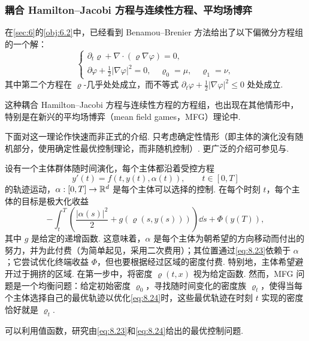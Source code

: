 \subsubsection*{耦合 Hamilton--Jacobi 方程与连续性方程、平均场博弈}
在\autoref{sec:6}的\autoref{obj:6.2}中，已经看到 Benamou--Brenier 方法给出了以下偏微分方程组的一个解：
\[
\begin{cases}
\partial_t\varrho+\nabla\cdot(\varrho\nabla\varphi)=0,\\
\partial\varphi+\frac12|\nabla\varphi|^2=0,\quad\varrho_0=\mu,\quad\varrho_1=\nu,
\end{cases}
\]
其中第二个方程在 $\varrho$-几乎处处成立，而不等式 $\partial_t\varphi+\frac12|\nabla\varphi|^2\leq0$ 处处成立.

\label{idx:i27-p316}
这种耦合 Hamilton--Jacobi 方程与连续性方程的方程组，也出现在其他情形中，特别是在新兴的平均场博弈（mean field games，MFG）理论中.

\label{idx:i97-p316}
下面对这一理论作快速而非正式的介绍. 只考虑确定性情形（即主体的演化没有随机部分，使用确定性最优控制理论，而非随机控制）. 更广泛的介绍可参见\cite{b205,b206}与\cite{b105}.

设有一个主体群体随时间演化，每个主体都沿着受控方程
\begin{equation}\label{eq:8.23}
y'(t)=f(t,y(t),\alpha(t)),\qquad t\in[0,T]
\end{equation}
的轨迹运动，$\alpha:[0,T]\to\mathbb R^d$ 是每个主体可以选择的控制. 在每个时刻 $t$，每个主体的目标是极大化收益
\begin{equation}\label{eq:8.24}
-\int_t^T\left(\frac{|\alpha(s)|^2}2+g(\varrho(s,y(s)))\right)\dd s+\Phi(y(T)),
\end{equation}
其中 $g$ 是给定的递增函数. 这意味着，$\alpha$ 是每个主体为朝希望的方向移动而付出的努力，并为此付费（为简单起见，采用二次费用）；其位置通过\eqref{eq:8.23}依赖于 $\alpha$；它尝试优化终端收益 $\Phi$，但也要根据经过区域的密度付费. 特别地，主体希望避开过于拥挤的区域. 在第一步中，将密度 $\varrho(t,x)$ 视为给定函数. \label{idx:i53-p316}
然而，MFG 问题是一个均衡问题：给定初始密度 $\varrho_0$，寻找随时间变化的密度族 $\varrho_t$，使得当每个主体选择自己的最优轨迹以优化\eqref{eq:8.24}时，这些最优轨迹在时刻 $t$ 实现的密度恰好就是 $\varrho_t$.

可以利用值函数，研究由\eqref{eq:8.23}和\eqref{eq:8.24}给出的最优控制问题.

